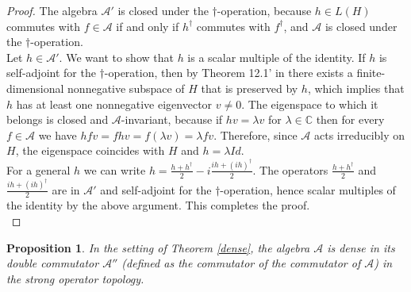 \documentclass{article}
\theoremstyle{definition}
\theoremstyle{remark}
\theoremstyle{plain}
\newtheorem{prp}[dfn]{Proposition}
\begin{document}
\begin{proof}
     The algebra $\mathcal{A}'$ is closed under the $\dag$-operation, because $h\in L(H)$ commutes with $f\in\mathcal{A}$ if and only if $h^\dag$ commutes with $f^\dag$, and $\mathcal{A}$ is closed under the $\dag$-operation. \\
    
    Let $h\in\mathcal{A}'$. We want to show that $h$ is a scalar multiple of the identity. If $h$ is self-adjoint for the $\dag$-operation, then by Theorem 12.1' in \cite{iohkrlan} there exists a finite-dimensional nonnegative subspace of $H$ that is preserved by $h$, which implies that $h$ has at least one nonnegative eigenvector $v\neq 0$. The eigenspace to which it belongs is closed and $\mathcal{A}$-invariant, because if $hv=\lambda v$ for $\lambda\in\mathbb{C}$ then for every $f\in\mathcal{A}$ we have $hfv=fhv=f(\lambda v)=\lambda fv$. Therefore, since $\mathcal{A}$ acts irreducibly on $H$, the eigenspace coincides with $H$ and $h=\lambda Id$. \\

    For a general $h$ we can write $h=\frac{h+h^\dag}{2}-i\frac{ih+(ih)^\dag}{2}$. The operators $\frac{h+h^\dag}{2}$ and $\frac{ih+(ih)^\dag}{2}$ are in $\mathcal{A}'$ and self-adjoint for the $\dag$-operation, hence scalar multiples of the identity by the above argument. This completes the proof. \\
\end{proof}

\begin{prp}
    In the setting of Theorem \ref{dense}, the algebra $\mathcal{A}$ is dense in its double commutator $\mathcal{A}''$ (defined as the commutator of the commutator of $\mathcal{A}$) in the strong operator topology. \\
\end{prp}
\end{document}
